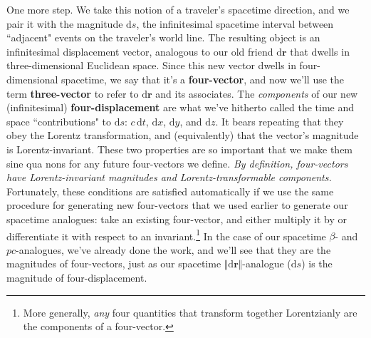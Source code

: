 \documentclass[12pt]{article}
\renewcommand{\vv}[1]{\mathbf{#1}}
\newcommand{\dd}[1]{\mathrm{d}#1}
\begin{document}
One more step. We take this notion of a traveler's spacetime direction, and we pair it with the magnitude $\dd s$, the infinitesimal spacetime interval between ``adjacent" events on the traveler's world line. The resulting object is an infinitesimal displacement vector, analogous to our old friend $\dd \vv r$ that dwells in three-dimensional Euclidean space. Since this new vector dwells in four-dimensional spacetime, we say that it's a \textbf{four-vector}, and now we'll use the term \textbf{three-vector} to refer to $\dd \vv r$ and its associates. The \emph{components} of our new (infinitesimal) \textbf{four-displacement} are what we've hitherto called the time and space ``contributions" to $\dd s$: $c \, \dd t$, $\dd x$, $\dd y$, and $\dd z$. It bears repeating that they obey the Lorentz transformation, and (equivalently) that the vector's magnitude is Lorentz-invariant. These two properties are so important that we make them sine qua nons for any future four-vectors we define. \emph{By definition, four-vectors have Lorentz-invariant magnitudes and Lorentz-transformable components.} Fortunately, these conditions are satisfied automatically if we use the same procedure for generating new four-vectors that we used earlier to generate our spacetime analogues: take an existing four-vector, and either multiply it by or differentiate it with respect to an invariant.\footnote{More generally, \emph{any} four quantities that transform together Lorentzianly are the components of a four-vector.} In the case of our spacetime $\beta$- and $p c$-analogues, we've already done the work, and we'll see that they are the magnitudes of four-vectors, just as our spacetime $\Vert \dd \vv r \Vert$-analogue ($\dd s$) is the magnitude of four-displacement.
\end{document}
